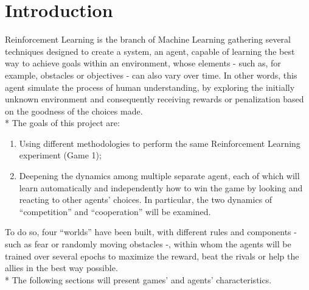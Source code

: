 \newpage
\tableofcontents
\newpage
\section{Introduction}
Reinforcement Learning is the branch of Machine Learning gathering several techniques designed to create a system, an agent, capable of learning the best way to achieve goals within an environment, whose elements - such as, for example, obstacles or objectives - can also vary over time. In other words, this agent simulate the process of human understanding, by exploring the initially unknown environment and consequently receiving rewards or penalization based on the goodness of the choices made.\\*
The goals of this project are:
\begin{enumerate}[noitemsep, topsep=0ex]
	\item Using different methodologies to perform the same Reinforcement Learning experiment (Game 1);
	\item Deepening the dynamics among multiple separate agent, each of which will learn automatically and independently how to win the game by looking and reacting to other agents' choices. In particular, the two dynamics of ``competition'' and ``cooperation'' will be examined.
\end{enumerate}
To do so, four ``worlds'' have been built, with different rules and components - such as fear or randomly moving obstacles -, within whom the agents will be trained over several epochs to maximize the reward, beat the rivals or help the allies in the best way possible.\\*
The following sections will present games' and agents' characteristics.
\newpage

